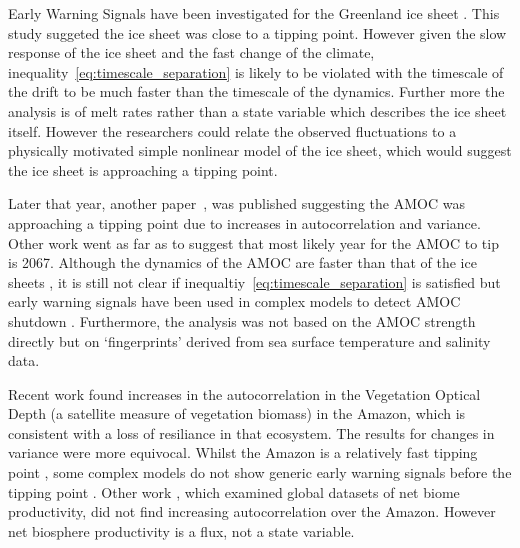Early Warning Signals have been investigated for the Greenland ice sheet \parencite{Boers2021}. This study suggeted the ice sheet was close to a tipping point.
However given the slow response of the ice sheet and
the fast change of the climate, inequality~\ref{eq:timescale_separation} is likely to be violated with the timescale of the drift to be much faster than the timescale of the dynamics.
Further more the analysis is of melt rates
rather than a state variable which describes the ice sheet itself. However the researchers could relate the observed fluctuations to a physically motivated simple nonlinear model of the ice sheet,
which would suggest the ice sheet is approaching a tipping point.

Later that year, another paper~\cite{Boers2021a}, was published suggesting the AMOC was approaching a tipping point due to increases in autocorrelation and variance.
Other work \parencite{Ditlevsen2022arxiv} went as far
as to suggest that most likely year for the AMOC to tip is 2067. Although the dynamics of the AMOC are faster than that of the ice sheets \parencite{ArmstrongMcKay2022}, it is still not clear if
inequaltiy~\ref{eq:timescale_separation} is satisfied but early warning signals have been used in complex models to detect AMOC shutdown \parencite{Boulton2014}.
Furthermore, the analysis was not based on the AMOC strength directly but on `fingerprints' derived from sea surface temperature and salinity data.

Recent work \parencite{Boulton2022} found increases in the autocorrelation in  the Vegetation Optical Depth (a satellite measure of vegetation biomass) in the Amazon,
which is consistent with a loss of resiliance in that
ecosystem. The results for changes in variance were more equivocal. Whilst the Amazon is a relatively fast tipping point \parencite{Ritchie2021}, some complex models do not show
generic early warning signals before the
tipping point \parencite{Boulton2013}. Other work \parencite{Fernandez-Martinez2023}, which examined global datasets of net biome productivity, did not find increasing autocorrelation
over the Amazon. However net biosphere productivity is a flux, not a state variable.